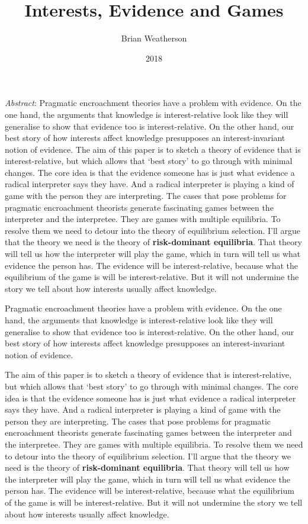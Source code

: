 \documentclass[
  11pt,
  letterpaper,
  DIV=11,
  numbers=noendperiod,
  twoside]{scrartcl}
\title{Interests, Evidence and Games}
\author{Brian Weatherson}
\date{2018}
\renewenvironment{abstract}
 {\vspace{-1.25cm}
 \quotation\small\noindent\emph{Abstract}:}
 {\endquotation}
\renewenvironment{abstract}
 {\quotation\small\noindent\emph{Abstract}:}
 {\endquotation\vspace{-0.02cm}}
\begin{document}
\maketitle
\begin{abstract}
Pragmatic encroachment theories have a problem with evidence. On the one
hand, the arguments that knowledge is interest-relative look like they
will generalise to show that evidence too is interest-relative. On the
other hand, our best story of how interests affect knowledge presupposes
an interest-invariant notion of evidence. The aim of this paper is to
sketch a theory of evidence that is interest-relative, but which allows
that `best story' to go through with minimal changes. The core idea is
that the evidence someone has is just what evidence a radical
interpreter says they have. And a radical interpreter is playing a kind
of game with the person they are interpreting. The cases that pose
problems for pragmatic encroachment theorists generate fascinating games
between the interpreter and the interpretee. They are games with
multiple equilibria. To resolve them we need to detour into the theory
of equilibrium selection. I'll argue that the theory we need is the
theory of \textbf{risk-dominant equilibria}. That theory will tell us
how the interpreter will play the game, which in turn will tell us what
evidence the person has. The evidence will be interest-relative, because
what the equilibrium of the game is will be interest-relative. But it
will not undermine the story we tell about how interests usually affect
knowledge.
\end{abstract}


Pragmatic encroachment theories have a problem with evidence. On the one
hand, the arguments that knowledge is interest-relative look like they
will generalise to show that evidence too is interest-relative. On the
other hand, our best story of how interests affect knowledge presupposes
an interest-invariant notion of evidence.

The aim of this paper is to sketch a theory of evidence that is
interest-relative, but which allows that `best story' to go through with
minimal changes. The core idea is that the evidence someone has is just
what evidence a radical interpreter says they have. And a radical
interpreter is playing a kind of game with the person they are
interpreting. The cases that pose problems for pragmatic encroachment
theorists generate fascinating games between the interpreter and the
interpretee. They are games with multiple equilibria. To resolve them we
need to detour into the theory of equilibrium selection. I'll argue that
the theory we need is the theory of \textbf{risk-dominant equilibria}.
That theory will tell us how the interpreter will play the game, which
in turn will tell us what evidence the person has. The evidence will be
interest-relative, because what the equilibrium of the game is will be
interest-relative. But it will not undermine the story we tell about how
interests usually affect knowledge.
\end{document}
